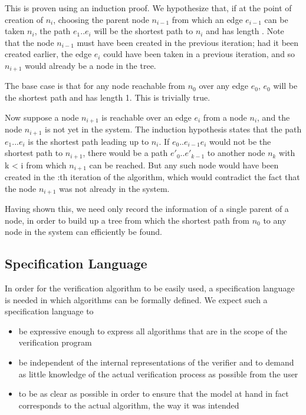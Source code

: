  This is proven using an induction proof. We hypothesize that, if at the point of creation of $n_i$, choosing the parent node $n_{i-1}$ from which an edge $e_{i-1}$ can be taken $n_i$, the path $e_1..e_{i}$ will be the shortest path to $n_i$ and has length . Note that the node $n_{i-1}$ must have been created in the previous iteration; had it been created earlier, the edge $e_i$ could have been taken in a previous iteration, and so $n_{i+1}$ would already be a node in the tree.
 
The base case is that for any node reachable from $n_0$ over any edge $e_0$, $e_0$ will be the shortest path and has length 1. This is trivially true.
 
Now suppose a node $n_{i+1}$ is reachable over an edge $e_i$ from a node $n_i$, and the node $n_{i+1}$ is not yet in the system. The induction hypothesis states that the path $e_1...e_i$ is the shortest path leading up to $n_i$. If $e_0..e_{i-1}e_i$ would not be the shortest path to $n_{i+1}$, there would be a path $e'_0..e'_{k-1}$ to another node $n_k$ with k < i from which $n_{i+1}$ can be reached. But any such node would have been created in the :th iteration of the algorithm, which would contradict the fact that the node $n_{i+1}$ was not already in the system.
 
Having shown this, we need only record the information of a single parent of a node, in order to build up a tree from which the shortest path from $n_0$ to any node in the system can efficiently be found.


\subsection{Specification Language}
In order for the verification algorithm to be easily used, a specification language is needed in which algorithms can be formally defined. We expect such a specification language to

\begin{itemize}
\item
be expressive enough to express all algorithms that are in the scope of the verification program
\item
be independent of the internal representations of the verifier and to demand as little knowledge of the actual verification process as possible from the user
\item
to be as clear as possible in order to ensure that the model at hand in fact corresponds to the actual algorithm, the way it was intended
\end{itemize}

